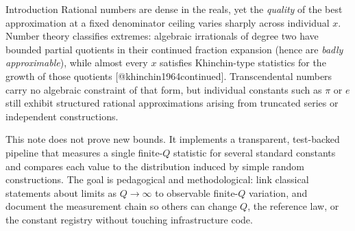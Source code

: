 \documentclass[
  ignorenonframetext,
]{beamer}
\author{\texorpdfstring{}{}}
\date{}
\begin{document}
\begin{frame}{Introduction}
\protect{}\label{introduction}
Rational numbers are dense in the reals, yet the \emph{quality} of the
best approximation at a fixed denominator ceiling varies sharply across
individual \(x\). Number theory classifies extremes: algebraic
irrationals of degree two have bounded partial quotients in their
continued fraction expansion (hence are \emph{badly approximable}),
while almost every \(x\) satisfies Khinchin-type statistics for the
growth of those quotients {[}@khinchin1964continued{]}. Transcendental
numbers carry no algebraic constraint of that form, but individual
constants such as \(\pi\) or \(e\) still exhibit structured rational
approximations arising from truncated series or independent
constructions.

This note does not prove new bounds. It implements a transparent,
test-backed pipeline that measures a single finite-\(Q\) statistic for
several standard constants and compares each value to the distribution
induced by simple random constructions. The goal is pedagogical and
methodological: link classical statements about limits as \(Q\to\infty\)
to observable finite-\(Q\) variation, and document the measurement chain
so others can change \(Q\), the reference law, or the constant registry
without touching infrastructure code.
\end{frame}
\end{document}
